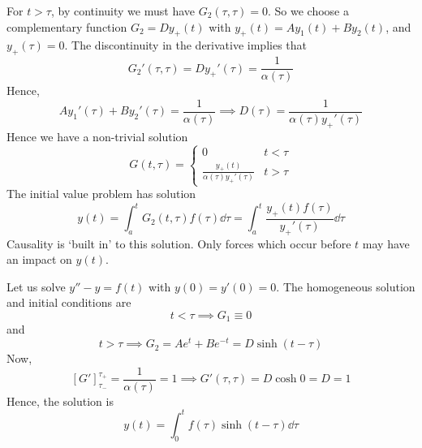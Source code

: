 For \( t > \tau \), by continuity we must have \( G_2(\tau, \tau) = 0 \).
So we choose a complementary function \( G_2 = D y_+(t) \) with \( y_+(t) = A y_1(t) + B y_2(t) \), and \( y_+(\tau) = 0 \).
The discontinuity in the derivative implies that
\[
	G_2'(\tau, \tau) = Dy_+'(\tau) = \frac{1}{\alpha(\tau)}
\]
Hence,
\[
	A y_1'(\tau) + B y_2'(\tau) = \frac{1}{\alpha(\tau)} \implies D(\tau) = \frac{1}{\alpha(\tau) y_+'(\tau)}
\]
Hence we have a non-trivial solution
\[
	G(t, \tau) = \begin{cases}
		0                                      & t < \tau \\
		\frac{y_+(t)}{\alpha(\tau) y_+'(\tau)} & t > \tau
	\end{cases}
\]
The initial value problem has solution
\[
	y(t) = \int_a^t G_2(t, \tau) f(\tau) \dd{\tau} = \int_a^t \frac{y_+(t) f(\tau)}{y_+'(\tau)} \dd{\tau}
\]
Causality is `built in' to this solution.
Only forces which occur before \( t \) may have an impact on \( y(t) \).
\begin{example}
	Let us solve \( y''-y = f(t) \) with \( y(0) = y'(0) = 0 \).
	The homogeneous solution and initial conditions are
	\[
		t < \tau \implies G_1 \equiv 0
	\]
	and
	\[
		t > \tau \implies G_2 = A e^t + Be^{-t} = D \sinh (t - \tau)
	\]
	Now,
	\[
		[G']_{\tau_-}^{\tau_+} = \frac{1}{\alpha(\tau)} = 1 \implies G'(\tau, \tau) = D \cosh 0 = D = 1
	\]
	Hence, the solution is
	\[
		y(t) = \int_0^t f(\tau) \sinh (t - \tau) \dd{\tau}
	\]
\end{example}

